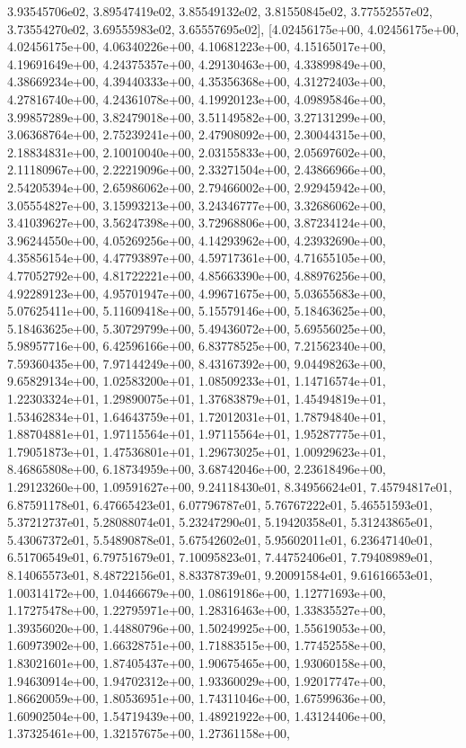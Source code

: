 \documentclass[letterpaper,10pt,english]{sphinxmanual}
\begin{document}
\begin{fulllineitems}
3.93545706e\sphinxhyphen{}02, 3.89547419e\sphinxhyphen{}02, 3.85549132e\sphinxhyphen{}02, 3.81550845e\sphinxhyphen{}02, 3.77552557e\sphinxhyphen{}02, 3.73554270e\sphinxhyphen{}02, 3.69555983e\sphinxhyphen{}02, 3.65557695e\sphinxhyphen{}02{]}, {[}4.02456175e+00, 4.02456175e+00, 4.02456175e+00, 4.06340226e+00, 4.10681223e+00, 4.15165017e+00, 4.19691649e+00, 4.24375357e+00, 4.29130463e+00, 4.33899849e+00, 4.38669234e+00, 4.39440333e+00, 4.35356368e+00, 4.31272403e+00, 4.27816740e+00, 4.24361078e+00, 4.19920123e+00, 4.09895846e+00, 3.99857289e+00, 3.82479018e+00, 3.51149582e+00, 3.27131299e+00, 3.06368764e+00, 2.75239241e+00, 2.47908092e+00, 2.30044315e+00, 2.18834831e+00, 2.10010040e+00, 2.03155833e+00, 2.05697602e+00, 2.11180967e+00, 2.22219096e+00, 2.33271504e+00, 2.43866966e+00, 2.54205394e+00, 2.65986062e+00, 2.79466002e+00, 2.92945942e+00, 3.05554827e+00, 3.15993213e+00, 3.24346777e+00, 3.32686062e+00, 3.41039627e+00, 3.56247398e+00, 3.72968806e+00, 3.87234124e+00, 3.96244550e+00, 4.05269256e+00, 4.14293962e+00, 4.23932690e+00, 4.35856154e+00, 4.47793897e+00, 4.59717361e+00, 4.71655105e+00, 4.77052792e+00, 4.81722221e+00, 4.85663390e+00, 4.88976256e+00, 4.92289123e+00, 4.95701947e+00, 4.99671675e+00, 5.03655683e+00, 5.07625411e+00, 5.11609418e+00, 5.15579146e+00, 5.18463625e+00, 5.18463625e+00, 5.30729799e+00, 5.49436072e+00, 5.69556025e+00, 5.98957716e+00, 6.42596166e+00, 6.83778525e+00, 7.21562340e+00, 7.59360435e+00, 7.97144249e+00, 8.43167392e+00, 9.04498263e+00, 9.65829134e+00, 1.02583200e+01, 1.08509233e+01, 1.14716574e+01, 1.22303324e+01, 1.29890075e+01, 1.37683879e+01, 1.45494819e+01, 1.53462834e+01, 1.64643759e+01, 1.72012031e+01, 1.78794840e+01, 1.88704881e+01, 1.97115564e+01, 1.97115564e+01, 1.95287775e+01, 1.79051873e+01, 1.47536801e+01, 1.29673025e+01, 1.00929623e+01, 8.46865808e+00, 6.18734959e+00, 3.68742046e+00, 2.23618496e+00, 1.29123260e+00, 1.09591627e+00, 9.24118430e\sphinxhyphen{}01, 8.34956624e\sphinxhyphen{}01, 7.45794817e\sphinxhyphen{}01, 6.87591178e\sphinxhyphen{}01, 6.47665423e\sphinxhyphen{}01, 6.07796787e\sphinxhyphen{}01, 5.76767222e\sphinxhyphen{}01, 5.46551593e\sphinxhyphen{}01, 5.37212737e\sphinxhyphen{}01, 5.28088074e\sphinxhyphen{}01, 5.23247290e\sphinxhyphen{}01, 5.19420358e\sphinxhyphen{}01, 5.31243865e\sphinxhyphen{}01, 5.43067372e\sphinxhyphen{}01, 5.54890878e\sphinxhyphen{}01, 5.67542602e\sphinxhyphen{}01, 5.95602011e\sphinxhyphen{}01, 6.23647140e\sphinxhyphen{}01, 6.51706549e\sphinxhyphen{}01, 6.79751679e\sphinxhyphen{}01, 7.10095823e\sphinxhyphen{}01, 7.44752406e\sphinxhyphen{}01, 7.79408989e\sphinxhyphen{}01, 8.14065573e\sphinxhyphen{}01, 8.48722156e\sphinxhyphen{}01, 8.83378739e\sphinxhyphen{}01, 9.20091584e\sphinxhyphen{}01, 9.61616653e\sphinxhyphen{}01, 1.00314172e+00, 1.04466679e+00, 1.08619186e+00, 1.12771693e+00, 1.17275478e+00, 1.22795971e+00, 1.28316463e+00, 1.33835527e+00, 1.39356020e+00, 1.44880796e+00, 1.50249925e+00, 1.55619053e+00, 1.60973902e+00, 1.66328751e+00, 1.71883515e+00, 1.77452558e+00, 1.83021601e+00, 1.87405437e+00, 1.90675465e+00, 1.93060158e+00, 1.94630914e+00, 1.94702312e+00, 1.93360029e+00, 1.92017747e+00, 1.86620059e+00, 1.80536951e+00, 1.74311046e+00, 1.67599636e+00, 1.60902504e+00, 1.54719439e+00, 1.48921922e+00, 1.43124406e+00, 1.37325461e+00, 1.32157675e+00, 1.27361158e+00, 
\end{fulllineitems}
\end{document}
